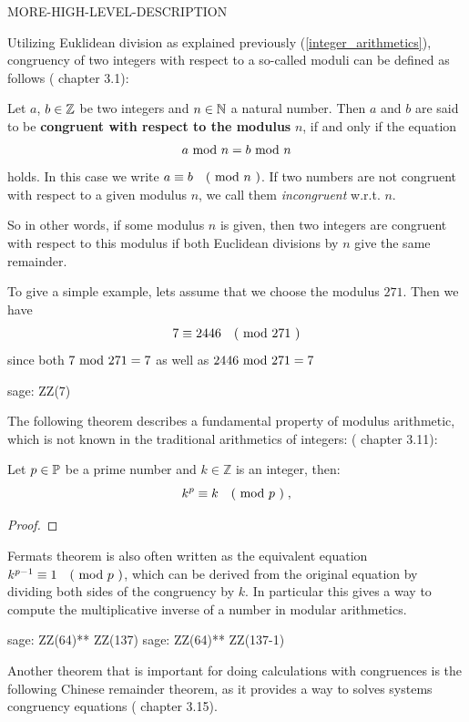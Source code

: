 MORE-HIGH-LEVEL-DESCRIPTION

Utilizing Euklidean division as explained previously (\ref{integer_arithmetics}), congruency of two integers with respect to a so-called moduli can be defined as follows
(\cite{JB} chapter 3.1):
\begin{definition}[congruency] Let $ a $, $ b \in \mathbb{Z} $ be two integers and $ n \in \mathbb{N} $ a natural number.
Then $ a $ and $ b $ are said to be \textbf{congruent with respect to the modulus} $ n $, if and only if the equation
\begin{equation}
a \text{ mod } n = b \text{ mod } n
\end{equation}
holds. In this case we write
$ a \equiv b \quad \text{( mod } n \text{ )} $. If two numbers are not congruent with respect to a given modulus $n$, we call them \textit{incongruent} w.r.t. $n$.
\end{definition}
So in other words, if some modulus $n$ is given, then two integers are congruent with respect to this modulus if both Euclidean divisions by $n$ give the same remainder.   
\begin{example}To give a simple example, lets assume that we choose the modulus $271$. Then we have
$$ 7 \equiv 2446 \quad \text{( mod } 271 \text{ )} $$
since both $7 \text{ mod } 271 = 7$ as well as $2446 \text{ mod } 271=7$
\begin{sagecommandline}
sage: ZZ(7) %
\end{sagecommandline}
\end{example}
The following theorem describes a fundamental property of modulus arithmetic, which is not known in the traditional arithmetics of integers: (\cite{JB} chapter 3.11):
\begin{theorem}  Let $ p \in \mathbb{P} $ be a prime number and $ k \in \mathbb{Z} $ is an integer, then:
\begin{equation}
k ^ p \equiv k \quad \text{( mod } p \text{ )} \;,
\end{equation}
\end{theorem}
\begin{proof} 
\end{proof}
\begin{remark}
Fermats theorem is also often written as the equivalent equation $k ^{p-1} \equiv 1 \quad \text{( mod } p \text{ )}$, which can be derived from the original equation by dividing both sides of the congruency by $k$. In particular this gives a way to compute the multiplicative inverse of a number in modular arithmetics. 
\begin{sagecommandline}
sage: ZZ(64)** ZZ(137) %
sage: ZZ(64)** ZZ(137-1) %
\end{sagecommandline}
\end{remark}
Another theorem that is important for doing calculations with congruences is the following Chinese remainder theorem, as it provides a way to solves systems congruency equations (\cite{JB} chapter 3.15).

